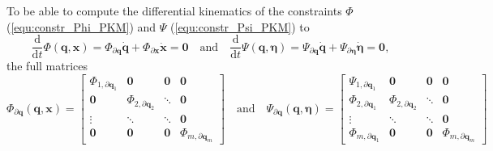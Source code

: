 \documentclass[robotics,article,accept,moreauthors,pdftex]{Definitions/mdpi}
\newcommand{\bm}[1]{\boldsymbol{#1}}
\let\Phi\varPhi
\let\Psi\varPsi
\begin{document}


To be able to compute the differential kinematics of the constraints $\bm{\Phi}$ (\ref{equ:constr_Phi_PKM}) and $\bm{\Psi}$ (\ref{equ:constr_Psi_PKM}) to
%
\begin{equation}
\frac{\mathrm{d}}{{\mathrm{d}}t} \bm{\Phi}(\bm{q},\bm{x})
=
\bm{\Phi}_{\partial \bm{q}} \dot{\bm{q}}
+
\bm{\Phi}_{\partial \bm{x}} \dot{\bm{x}}
=
\bm{0}
\quad
\mathrm{and}
\quad
\frac{\mathrm{d}}{{\mathrm{d}}t} \bm{\Psi}(\bm{q},\bm{\eta})
=
\bm{\Psi}_{\partial \bm{q}} \dot{\bm{q}}
+
\bm{\Psi}_{\partial \bm{\eta}} \dot{\bm{\eta}}
=
\bm{0},
\label{equ:constr_diff}
\end{equation}
%
the full   matrices 
%
\begin{equation}
\bm{\Phi}_{\partial \bm{q}}(\bm{q},\bm{x})
=
\begin{bmatrix}
\bm{\Phi}_{1,\partial\bm{q}_1} & \bm{0} & \bm{0} & \bm{0}\\
\bm{0} & \bm{\Phi}_{2,\partial\bm{q}_2} & \ddots & \bm{0} \\
\vdots & \ddots & \ddots & \bm{0} \\
\bm{0} & \bm{0} & \bm{0} &\bm{\Phi}_{m,\partial\bm{q}_m}
\end{bmatrix}
\quad
\mathrm{and}
\quad
\bm{\Psi}_{\partial \bm{q}}(\bm{q},\bm{\eta})
=
\begin{bmatrix}
\bm{\Psi}_{1,\partial\bm{q}_1} & \bm{0} & \bm{0} & \bm{0}\\
\bm{\Phi}_{2,\partial\bm{q}_1} & \bm{\Phi}_{2,\partial\bm{q}_2} & \ddots & \bm{0} \\
\vdots & \ddots & \ddots & \bm{0} \\
\bm{\Phi}_{m,\partial\bm{q}_1} & \bm{0} & \bm{0} &\bm{\Phi}_{m,\partial\bm{q}_m}
\end{bmatrix}
\label{equ:PhiPsi_grad_q_complete}
\end{equation}
\end{document}
